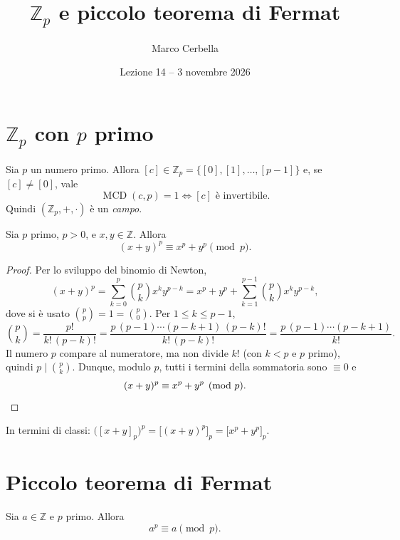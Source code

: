 \documentclass[11pt,a4paper]{article}
\title{$\mathbb{Z}_p$ e piccolo teorema di Fermat}
\author{Marco Cerbella}
\date{Lezione 14 -- 3 novembre 2026}
\begin{document}
\maketitle

\section{$\mathbb{Z}_p$ con $p$ primo}

\begin{osservazione}
Sia $p$ un numero primo. Allora $[c] \in \mathbb{Z}_p = \{[0], [1], \dots, [p-1]\}$ e, se $[c] \neq [0]$, vale
\[
  \operatorname{MCD}(c, p) = 1 \iff [c] \text{ è invertibile.}
\]
Quindi $(\mathbb{Z}_p, +, \cdot)$ è un \emph{campo}.
\end{osservazione}

\begin{proposizione}
Sia $p$ primo, $p > 0$, e $x, y \in \mathbb{Z}$. Allora
\[
  (x + y)^p \equiv x^p + y^p \pmod p .
\]
\end{proposizione}

\begin{proof}
Per lo sviluppo del binomio di Newton,
\[
  (x + y)^p = \sum_{k=0}^{p} \binom{p}{k} x^k y^{p-k} = x^p + y^p + \sum_{k=1}^{p-1}\binom{p}{k} x^k y^{p-k},
\]
dove si è usato $\binom{p}{p} = 1 = \binom{p}{0}$. Per $1 \le k \le p-1$,
\[
  \binom{p}{k} = \frac{p!}{k!\,(p-k)!} = \frac{p\,(p-1)\cdots(p-k+1)\,(p-k)!}{k!\,(p-k)!} = \frac{p\,(p-1)\cdots(p-k+1)}{k!} .
\]
Il numero $p$ compare al numeratore, ma non divide $k!$ (con $k < p$ e $p$ primo), quindi $p \mid \binom{p}{k}$. Dunque, modulo $p$, tutti i termini della sommatoria sono $\equiv 0$ e
\[
  (x + y)^p \equiv x^p + y^p \pmod p . \qedhere
\]
\end{proof}

\begin{osservazione}
In termini di classi: $\big([x + y]_p\big)^p = \big[(x + y)^p\big]_p = \big[x^p + y^p\big]_p$.
\end{osservazione}

\section{Piccolo teorema di Fermat}

\begin{teorema}
Sia $a \in \mathbb{Z}$ e $p$ primo. Allora
\[
  a^p \equiv a \pmod p .
\]
\end{teorema}
\end{document}
